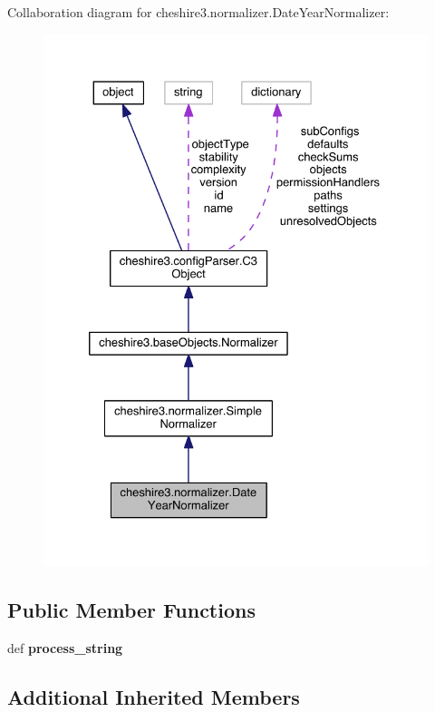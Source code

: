Collaboration diagram for cheshire3.\-normalizer.\-Date\-Year\-Normalizer\-:
\nopagebreak
\begin{figure}[H]
\begin{center}
\leavevmode
\includegraphics[width=328pt]{classcheshire3_1_1normalizer_1_1_date_year_normalizer__coll__graph}
\end{center}
\end{figure}
\subsection*{Public Member Functions}
\begin{DoxyCompactItemize}
\item 
\hypertarget{classcheshire3_1_1normalizer_1_1_date_year_normalizer_a5e686d01f48011cac41fc4efd7bad347}{def {\bfseries process\-\_\-string}}\label{classcheshire3_1_1normalizer_1_1_date_year_normalizer_a5e686d01f48011cac41fc4efd7bad347}

\end{DoxyCompactItemize}
\subsection*{Additional Inherited Members}


